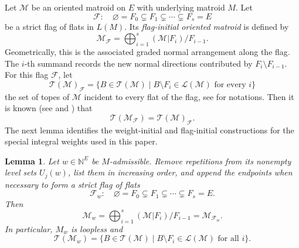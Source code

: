 \documentclass[10pt]{amsart}
\theoremstyle{plain}
\newtheorem{lemma}[theorem]{Lemma}
\theoremstyle{definition}
\newcommand{\NN}{\mathbb{N}}
\newcommand{\T}{\mathcal{T}}
\newcommand{\F}{\mathcal{F}}
\newcommand{\M}{\mathcal{M}}
\newcommand{\Lcov}{\mathcal{L}}
\begin{document}
Let $\M$ be an oriented matroid on $E$ with underlying matroid $M$. Let
\[
\F:\quad\varnothing=F_0\subsetneq F_1\subsetneq\cdots\subsetneq F_s=E
\]
be a strict flag of flats in $L(M)$. Its \emph{flag-initial oriented matroid} is defined by
\begin{equation}\label{initial-OM}
\M_{\F}=\bigoplus_{i=1}^s(\M|F_i)/F_{i-1}.
\end{equation}
Geometrically, this is the associated graded normal arrangement along the flag. The $i$-th summand records the new normal directions contributed by $F_i\setminus F_{i-1}$. For this flag $\F$, let
\[
\T(\M)_\F=\{B\in\T(\M) \mid B\setminus F_i\in\Lcov(\M)\text{ for every }i\}
\]
the set of topes of $\M$ incident to every flat of the flag, see  for notations. Then it is known (see \cite[Lemma 3.1]{Rau2022} and \cite[Proposition 3.5]{Shaw2026}) that
\begin{equation}\label{initial-topes}
\T(\M_{\F})=\T(\M)_{\F}.
\end{equation}
The next lemma identifies the weight-initial and flag-initial constructions for the special integral weights used in this paper.

\begin{lemma}\label{admissible-initial-loopless}
Let $w\in\NN^E$ be $M$-admissible. Remove repetitions from its nonempty level sets $U_j(w)$, list them in increasing order, and append the endpoints when necessary to form a strict flag of flats
\[
\F_w:\quad \varnothing=F_0\subsetneq F_1\subsetneq\cdots\subsetneq F_s=E.
\]
Then
\[
\M_w=\bigoplus_{i=1}^s(\M|F_i)/F_{i-1}=\M_{\F_w}.
\]
In particular, $M_w$ is loopless and
\[
\T(\M_w)=\{B\in\T(\M) \mid B\setminus F_i\in\Lcov(\M)\text{ for all }i\}.
\]
\end{lemma}
\end{document}

